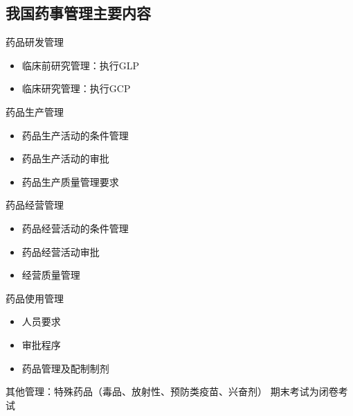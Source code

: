 \subsection{我国药事管理主要内容}%
\label{sub:我国药事管理主要内容}
\begin{notation}
    药品研发管理
    \begin{itemize}
        \item 临床前研究管理：执行GLP
        \item 临床研究管理：执行GCP
    \end{itemize}
\end{notation}
\begin{notation}
    药品生产管理
    \begin{itemize}
        \item 药品生产活动的条件管理
        \item 药品生产活动的审批
        \item 药品生产质量管理要求
    \end{itemize}
\end{notation}
\begin{notation}
    药品经营管理
    \begin{itemize}
        \item 药品经营活动的条件管理
        \item 药品经营活动审批
        \item 经营质量管理
    \end{itemize}
\end{notation}
\begin{notation}
    药品使用管理
    \begin{itemize}
        \item 人员要求
        \item 审批程序
        \item 药品管理及配制制剂 
    \end{itemize}
\end{notation}
其他管理：特殊药品（毒品、放射性、预防类疫苗、兴奋剂）
{}
期末考试为闭卷考试
